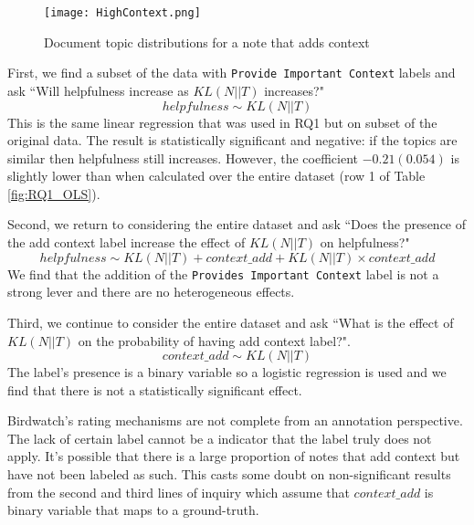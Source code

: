 \documentclass [11pt, proquest] {uwthesis}[2020/02/24]
\begin{document}
\begin{figure}[h]
\centering
\texttt{[image: HighContext.png]}
\caption{Document topic distributions for a note that adds context  }
\label{fig:highcontext}
\end{figure}


First, we find a subset of the data with \verb|Provide Important Context| labels and ask ``Will helpfulness increase as $KL(N || T)$ increases?" $$helpfulness \sim KL(N || T)$$ This is the same linear regression that was used in RQ1 but on subset of the original data. The result is statistically significant and negative: if the topics are similar then helpfulness still increases.  However, the coefficient $-0.21(0.054)$ is slightly lower than when calculated over the entire dataset (row 1 of Table \ref{fig:RQ1_OLS}).


Second, we return to considering the entire dataset and ask ``Does the presence of the add context label increase the effect of $KL(N || T)$ on helpfulness?" $$helpfulness \sim KL(N || T) + context\_add + KL(N || T) \times context\_add$$ We find that the addition of the \verb|Provides Important Context| label is not a strong lever and there are no heterogeneous effects.

Third, we continue to consider the entire dataset and ask ``What is the effect of $KL(N || T)$ on the probability of having add context label?". $$context\_add \sim KL(N || T)$$ The label's presence is a binary variable so a logistic regression is used and we find that there is not a statistically significant effect.

Birdwatch's rating mechanisms are not complete from an annotation perspective. The lack of certain label cannot be a indicator that the label truly does not apply. It's possible that there is a large proportion of notes that add context but have not been labeled as such. This casts some doubt on non-significant results from the second and third lines of inquiry which assume that $context\_add$ is binary variable that maps to a ground-truth.


\end{document}
